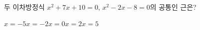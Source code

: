 두 이차방정식 $x^2+7x+10=0$, $x^2-2x-8=0$의 공통인 근은?
\begin{choices32}{$x=-5$}{$x=-2$}{$x=0$}{$x=2$}{$x=5$}\end{choices32}
